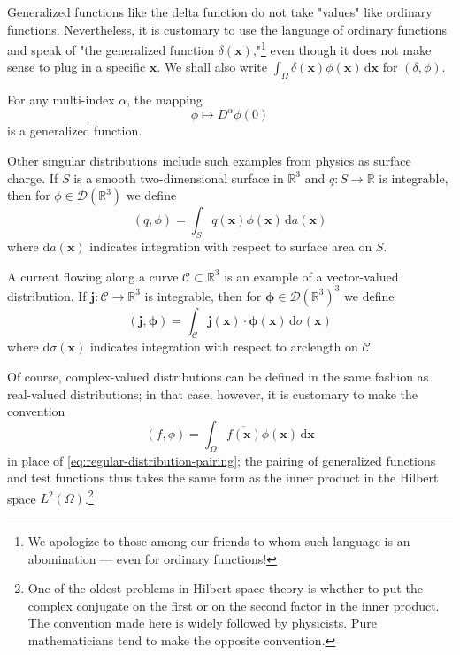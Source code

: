 \begin{Remark}
\label{rem:generalized-function-point-values}
Generalized functions like the delta function do not take "values" like ordinary functions. Nevertheless, it is customary to use the language of ordinary functions and speak of "the generalized function $\delta(\bm{x})$,"\footnote{We apologize to those among our friends to whom such language is an abomination --- even for ordinary functions!} even though it does not make sense to plug in a specific $\bm{x}$. We shall also write $\int_\Omega\delta(\bm{x})\phi(\bm{x})\,\mathrm{d}\bm{x}$ for $(\delta,\phi)$.
\end{Remark}

\begin{Example}
\label{ex:point-derivative-functional}
For any multi-index $\alpha$, the mapping \[\phi\mapsto D^\alpha\phi(0)\] is a generalized function.
\end{Example}

\begin{Example}
\label{ex:surface-charge-distribution}
Other singular distributions include such examples from physics as surface charge. If $S$ is a smooth two-dimensional surface in $\mathbb{R}^3$ and $q:S\to\mathbb{R}$ is integrable, then for $\phi\in\mathcal{D}(\mathbb{R}^3)$ we define\[(q,\phi)=\int_Sq(\bm{x})\phi(\bm{x})\,\mathrm{d}a(\bm{x})\]where $\mathrm{d}a(\bm{x})$ indicates integration with respect to surface area on $S$.
\end{Example}

\begin{Example}
\label{ex:curve-current-distribution}
A current flowing along a curve $\mathcal{C}\subset\mathbb{R}^3$ is an example of a vector-valued distribution. If $\bm{j}:\mathcal{C}\to\mathbb{R}^3$ is integrable, then for $\bm{\phi}\in\mathcal{D}(\mathbb{R}^3)^3$ we define\[(\bm{j},\bm{\phi})=\int_{\mathcal{C}}\bm{j}(\bm{x})\cdot\bm{\phi}(\bm{x})\,\mathrm{d}\sigma(\bm{x})\]where $\mathrm{d}\sigma(\bm{x})$ indicates integration with respect to arclength on $\mathcal{C}$.
\end{Example}

\begin{Remark}
\label{rem:complex-distribution-convention}
Of course, complex-valued distributions can be defined in the same fashion as real-valued distributions; in that case, however, it is customary to make the convention
\begin{equation}\label{eq:complex-distribution-conjugate-pairing}
(f,\phi)=\int_\Omega\overline{f(\bm{x})}\phi(\bm{x})\,\mathrm{d}\bm{x}
\end{equation}
in place of \eqref{eq:regular-distribution-pairing}; the pairing of generalized functions and test functions thus takes the same form as the inner product in the Hilbert space $L^2(\Omega)$.\footnote{One of the oldest problems in Hilbert space theory is whether to put the complex conjugate on the first or on the second factor in the inner product. The convention made here is widely followed by physicists. Pure mathematicians tend to make the opposite convention.}
\end{Remark}

